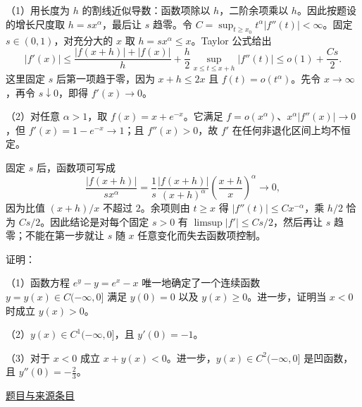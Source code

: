 \documentclass[UTF8,12pt,a4paper,fontset=fandol]{ctexart}
\begin{document}
\begin{solve}\label{ans:fin13-high:7}

（1）用长度为 $h$ 的割线近似导数：函数项除以 $h$，二阶余项乘以 $h$。因此按题设的增长尺度取 $h=sx^\alpha$，最后让 $s$ 趋零。令 $C=\sup_{t\ge x_0}t^\alpha|f''(t)|<\infty$。固定 $s\in(0,1)$，对充分大的 $x$ 取 $h=sx^\alpha\le x$。Taylor 公式给出
\[
|f'(x)|\le\frac{|f(x+h)|+|f(x)|}{h}
       +\frac h2\sup_{x\le t\le x+h}|f''(t)|
\le o(1)+\frac{Cs}{2}.
\]
这里固定 $s$ 后第一项趋于零，因为 $x+h\le2x$ 且 $f(t)=o(t^\alpha)$。先令 $x\to\infty$，再令 $s\downarrow0$，即得 $f'(x)\to0$。

（2）对任意 $\alpha>1$，取 $f(x)=x+e^{-x}$。它满足 $f=o(x^\alpha)$、$x^\alpha|f''(x)|\to0$，但 $f'(x)=1-e^{-x}\to1$；且 $f''(x)>0$，故 $f'$ 在任何非退化区间上均不恒定。

固定 $s$ 后，函数项可写成
\[
\frac{|f(x+h)|}{sx^\alpha}
=\frac1s\frac{|f(x+h)|}{(x+h)^\alpha}\left(\frac{x+h}{x}\right)^\alpha\to0,
\]
因为比值 $(x+h)/x$ 不超过 $2$。余项则由 $t\ge x$ 得 $|f''(t)|\le Cx^{-\alpha}$，乘 $h/2$ 恰为 $Cs/2$。因此结论是对每个固定 $s>0$ 有 $\limsup|f'|\le Cs/2$，然后再让 $s$ 趋零；不能在第一步就让 $s$ 随 $x$ 任意变化而失去函数项控制。

\end{solve}

\begin{example}\label{ex:fin13-low:9}\label{pr:fin13-low:9}

证明：

（1）函数方程 $e^{y} - y = e^{x} - x$ 唯一地确定了一个连续函数 $y = y(x) \in C(-\infty, 0]$ 满足 $y(0) = 0$ 以及 $y(x) \geq 0$。进一步，证明当 $x < 0$ 时成立 $y(x) > 0$。

（2）$y(x) \in C^{1}(-\infty, 0]$，且 $y'(0) = -1$。

（3）对于 $x < 0$ 成立 $x + y(x) < 0$。进一步，$y(x) \in C^{2}(-\infty, 0]$ 是凹函数，且 $y''(0) = -\frac{2}{3}$。

\par\href{https://github.com/lzxcr/cmc-mathematics/blob/64916fa1fdbc3e444a652eca204d5669058ee321/src/problems/finals/13/10.md}{题目与来源条目}

\end{example}
\end{document}
